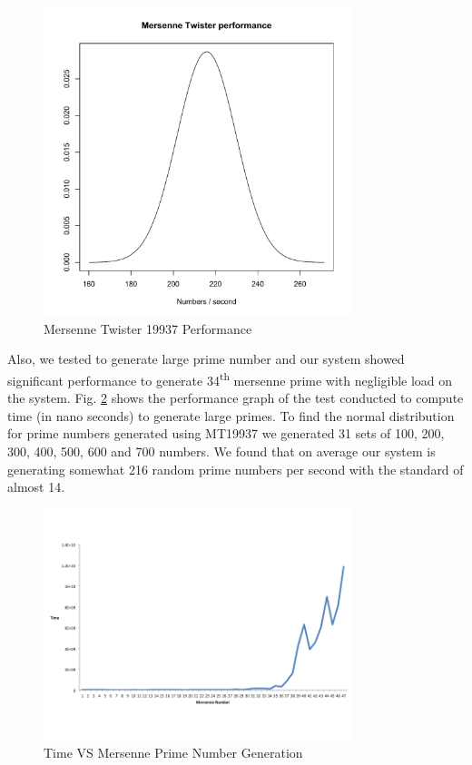 \documentclass[12pt,journal,compsoc]{IEEEtran}
\begin{document}
\begin{figure}[ht!]
\centering
\includegraphics[width=90mm]{images/Rplot.pdf}
\caption{Mersenne Twister 19937 Performance}
\label{fig:mersenne_performance}
\end{figure}

Also, we tested to generate large prime number and our system showed significant performance to generate 34\textsuperscript{th} mersenne prime with negligible load on the system. Fig. \ref{fig:mersenne_time} shows the performance graph of the test conducted to compute time (in nano seconds) to generate large primes. To find the normal distribution for prime numbers generated using MT19937 we generated 31 sets of 100, 200, 300, 400, 500, 600 and 700 numbers. We found that on average our system is generating somewhat 216 random prime numbers per second with the standard of almost 14.

\begin{figure}[ht!]
\centering
\includegraphics[width=90mm]{images/mersenneTime.png}
\caption{Time VS Mersenne Prime Number Generation}
\label{fig:mersenne_time}
\end{figure}
\end{document}
